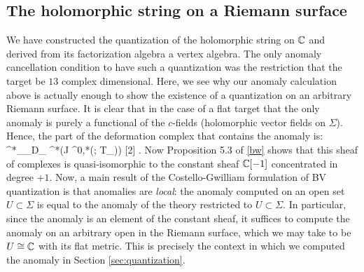 

\subsection{The holomorphic string on a Riemann surface}

We have constructed the quantization of the holomorphic string on $\mathbb C$ and derived from its factorization algebra a vertex algebra. 
The only anomaly cancellation condition to have such a quantization was the restriction that the target be $13$ complex dimensional. 
Here, we see why our anomaly calculation above is actually enough to show the existence of a quantization on an arbitrary Riemann surface. 
It is clear that in the case of a flat target that the only anomaly is purely a functional of the $c$-fields (holomorphic vector fields on $\Sigma$).
Hence, the part of the deformation complex that contains the anomaly is:
\ben
\Omega^{*}_\Sigma \tensor_{D_\Sigma} \cred^*(J \Omega^{0,*}(\Sigma ; T_\Sigma)) [2] .
\een
Now Proposition 5.3 of \ref{bw} shows that this sheaf of complexes is quasi-isomorphic to the constant sheaf $\mathbb C[-1]$ concentrated in degree $+1$. 
Now, a main result of the Costello-Gwilliam formulation of BV quantization is that anomalies are {\em local}: the anomaly computed on an open set $U \subset \Sigma$ is equal to the anomaly of the theory restricted to $U \subset \Sigma$. 
In particular, since the anomaly is an element of the constant sheaf, it suffices to compute the anomaly on an arbitrary open in the Riemann surface, which we may take to be $U \cong \mathbb C$ with its flat metric. 
This is precisely the context in which we computed the anomaly in Section \ref{sec:quantization}.

